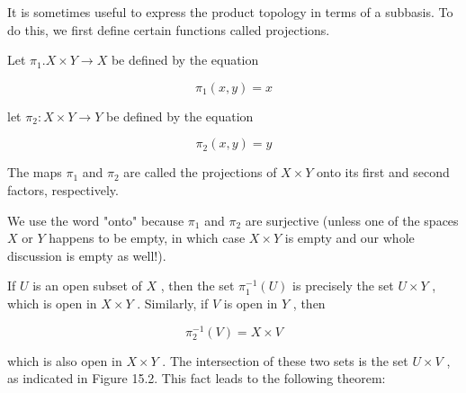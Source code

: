It is sometimes useful to express the product topology in terms of a subbasis. To do this, we first define certain functions called projections.

\begin{definition} Let \({\pi }_{1}.X \times  Y \rightarrow  X\) be defined by the equation

\[
{\pi }_{1}\left( {x,y}\right)  = x
\]

let \({\pi }_{2} : X \times  Y \rightarrow  Y\) be defined by the equation

\[
{\pi }_{2}\left( {x,y}\right)  = y
\]

The maps \({\pi }_{1}\) and \({\pi }_{2}\) are called the projections of \(X \times  Y\) onto its first and second factors, respectively.
\end{definition}

We use the word "onto" because \({\pi }_{1}\) and \({\pi }_{2}\) are surjective (unless one of the spaces \(X\) or \(Y\) happens to be empty, in which case \(X \times  Y\) is empty and our whole discussion is empty as well!).

If \(U\) is an open subset of \(X\) , then the set \({\pi }_{1}^{-1}\left( U\right)\) is precisely the set \(U \times  Y\) , which is open in \(X \times  Y\) . Similarly, if \(V\) is open in \(Y\) , then

\[
{\pi }_{2}^{-1}\left( V\right)  = X \times  V
\]

which is also open in \(X \times  Y\) . The intersection of these two sets is the set \(U \times  V\) , as indicated in Figure 15.2. This fact leads to the following theorem:

